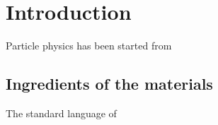 

\section{Introduction}
\label{sec:Introduction}

Particle physics has been started from 

\subsection{Ingredients of the materials}
\label{ssec:IntroToSM}

The standard language of 

\FloatBarrier

